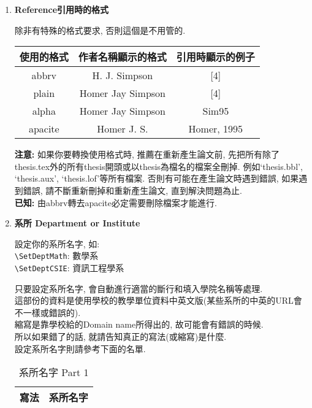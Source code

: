 \begin{enumerate}
  \item
  {
    \textbf{Reference引用時的格式}

    除非有特殊的格式要求, 否則這個是不用管的.\\

  \InsertTable
    {
        \begin{tabular}{|c|c|c|}
        \hline
        使用的格式   & 作者名稱顯示的格式         & 引用時顯示的例子    \\ \hline
        abbrv   & H. J. Simpson     & {[}4{]}     \\ \hline
        plain   & Homer Jay Simpson & {[}4{]}     \\ \hline
        alpha   & Homer Jay Simpson & Sim95       \\ \hline
        apacite & Homer J. S.       & Homer, 1995 \\ \hline
        \end{tabular}
    }

 \textbf{注意:} 如果你要轉換使用格式時, 推薦在重新產生論文前, 先把所有除了thesis.tex外的所有thesis開頭或以thesis為檔名的檔案全刪掉. 例如`thesis.bbl', `thesis.aux', `thesis.lof'等所有檔案.  否則有可能在產生論文時遇到錯誤, 如果遇到錯誤, 請不斷重新刪掉和重新產生論文, 直到解決問題為止.\\

 \textbf{已知:} 由abbrv轉去apacite必定需要刪除檔案才能進行.
  } %

  \item
  {
    \textbf{系所 Department or Institute}

    設定你的系所名字, 如:\\
    \verb|\SetDeptMath|: 數學系\\
    \verb|\SetDeptCSIE|: 資訊工程學系

    只要設定系所名字, 會自動進行適當的斷行和填入學院名稱等處理.\\

    這部份的資料是使用學校的教學單位資料中英文版(某些系所的中英的URL會不一樣或錯誤的).\\
    縮寫是靠學校給的Domain name所得出的, 故可能會有錯誤的時候.\\
    所以如果錯了的話, 就請告知真正的寫法(或縮寫)是什麼.\\

    設定系所名字則請參考下面的名單.

    \newpage
    \begin{table}[h]
      \caption{系所名字 Part 1}
      \begin{tabular}{|l|l|}
        \hline
        寫法 & 系所名字 \\ \hline


\end{tabular}
\end{table}}
\end{enumerate}
